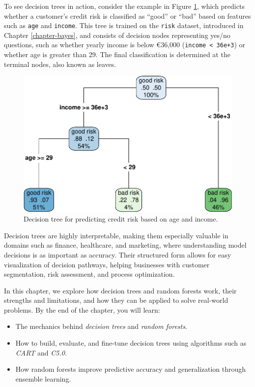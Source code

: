 \documentclass[
]{book}
\newcommand{\passthrough}[1]{#1}
\providecommand{\tightlist}{%
  \setlength{\itemsep}{0pt}\setlength{\parskip}{0pt}}
\theoremstyle{definition}
\theoremstyle{definition}
\theoremstyle{definition}
\theoremstyle{definition}
\theoremstyle{remark}
\begin{document}
To see decision trees in action, consider the example in Figure \ref{fig:tree-0}, which predicts whether a customer's credit risk is classified as ``good'' or ``bad'' based on features such as \passthrough{\lstinline!age!} and \passthrough{\lstinline!income!}. This tree is trained on the \passthrough{\lstinline!risk!} dataset, introduced in Chapter \ref{chapter-bayes}, and consists of decision nodes representing yes/no questions, such as whether yearly income is below €36,000 (\passthrough{\lstinline!income < 36e+3!}) or whether age is greater than 29. The final classification is determined at the terminal nodes, also known as leaves.

\begin{figure}

{\centering \includegraphics[width=0.75\linewidth]{tree_files/figure-latex/tree-0-1} 

}

\caption{Decision tree for predicting credit risk based on age and income.}\label{fig:tree-0}
\end{figure}

Decision trees are highly interpretable, making them especially valuable in domains such as finance, healthcare, and marketing, where understanding model decisions is as important as accuracy. Their structured form allows for easy visualization of decision pathways, helping businesses with customer segmentation, risk assessment, and process optimization.

In this chapter, we explore how decision trees and random forests work, their strengths and limitations, and how they can be applied to solve real-world problems. By the end of the chapter, you will learn:

\begin{itemize}
\tightlist
\item
  The mechanics behind \emph{decision trees} and \emph{random forests}.\\
\item
  How to build, evaluate, and fine-tune decision trees using algorithms such as \emph{CART} and \emph{C5.0}.\\
\item
  How random forests improve predictive accuracy and generalization through ensemble learning.
\end{itemize}
\end{document}
